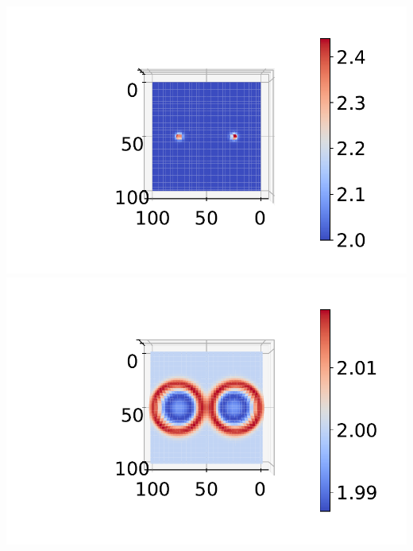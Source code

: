 \documentclass[
11pt, %
francais, %
singlespacing, %
headsepline, %
f%
]{MastersDoctoralThesis} %
\theoremstyle{definition}
\begin{document}
\begin{center}
\includegraphics[scale = 0.6]{gouttes2D0}
\includegraphics[scale = 0.6]{gouttes2D1} 
\end{center}
\end{document}
